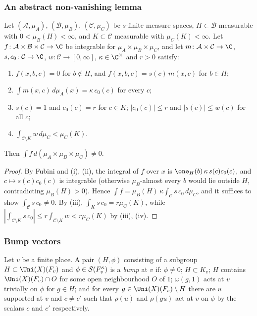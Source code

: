 \subsubsection*{An abstract non-vanishing lemma}
\begin{lemma}\label{pf:tlift:absne}
Let $(\mathcal A,\mu_A)$, $(\mathcal B,\mu_B)$, $(\mathcal C,\mu_C)$ be $s$-finite measure spaces, $H\subset\mathcal B$ measurable with
$0<\mu_B(H)<\infty$, and $K\subset\mathcal C$ measurable with $\mu_C(K)<\infty$. Let $f\colon\mathcal A\times\mathcal B\times\mathcal C\to\C$ be integrable
for $\mu_A\times\mu_B\times\mu_C$, and let $m\colon\mathcal A\times\mathcal C\to\C$, $s,c_0\colon\mathcal C\to\C$, $w\colon\mathcal C\to[0,\infty]$,
$\kappa\in\C^\times$ and $r>0$ satisfy:
\begin{enumerate}[label=(\roman*),nosep]
\item $f(x,b,c)=0$ for $b\notin H$, and $f(x,b,c)=s(c)\,m(x,c)$ for $b\in H$;
\item $\int m(x,c)\,d\mu_A(x)=\kappa\,c_0(c)$ for every $c$;
\item $s(c)=1$ and $c_0(c)=r$ for $c\in K$; $|c_0(c)|\le r$ and $|s(c)|\le w(c)$ for all $c$;
\item $\int_{\mathcal C\setminus K}w\,d\mu_C<\mu_C(K)$.
\end{enumerate}
Then $\int f\,d(\mu_A\times\mu_B\times\mu_C)\ne0$.
\end{lemma}

\begin{proof}
By Fubini and (i), (ii), the integral of $f$ over $x$ is $\one_H(b)\,\kappa\,s(c)c_0(c)$, and $c\mapsto s(c)c_0(c)$ is
integrable (otherwise $\mu_B$-almost every $b$ would lie outside $H$, contradicting $\mu_B(H)>0$). Hence
$\int f=\mu_B(H)\,\kappa\int_{\mathcal C}s\,c_0\,d\mu_C$, and it suffices to show $\int_{\mathcal C}s\,c_0\ne0$. By (iii),
$\int_Ks\,c_0=r\mu_C(K)$, while $|\int_{\mathcal C\setminus K}s\,c_0|\le r\int_{\mathcal C\setminus K}w<r\mu_C(K)$ by (iii), (iv).
\end{proof}

\subsubsection*{Bump vectors}
\begin{definition}\label{pf:tlift:bump}
Let $v$ be a finite place. A pair $(H,\phi)$ consisting of a subgroup $H\subset\Uni(X)(F_v)$ and
$\phi\in\mathcal{S}(F_v^\kappa)$ is a \emph{bump} at $v$ if: $\phi\ne0$; $H\subset K_v$; $H$ contains $\Uni(X)(F_v)\cap O$ for some
open neighbourhood $O$ of $1$; $\omega(g,1)$ acts at $v$ trivially on $\phi$ for $g\in H$; and for every
$g\in\Uni(X)(F_v)\setminus H$ there are $u$ supported at $v$ and $c\ne c'$ such that $\rho(u)$ and $\rho(gu)$ act at $v$ on
$\phi$ by the scalars $c$ and $c'$ respectively.
\end{definition}


